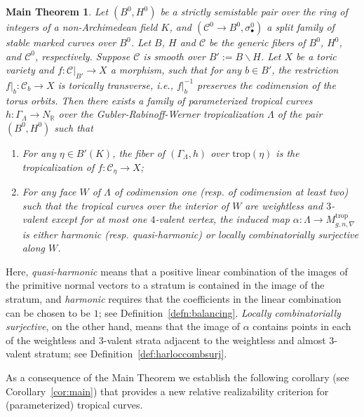 \documentclass[11pt,reqno]{amsart}
\newcommand{\com}[1]{{\color{brown}$\textsuperscript{+}$\marginnote{\small #1}}}
\numberwithin{equation}{section}
\newtheorem*{Thm}{Main Theorem}
\theoremstyle{definition}
\newcommand{\trop}{\mathrm{trop}}
\newcommand{\RR}{{\mathbb R}}
\def\:{\colon}
\newcommand{\cC}{{\mathcal{C}}}
\theoremstyle{remark}
\begin{document}
\begin{Thm}
    Let $(B^0,H^0)$ be a strictly semistable pair over the ring of integers of a non-Archi\-medean field $K$, and $(\cC^0\rightarrow B^0,\sigma^0_\bullet)$ a split family of stable marked curves over $B^0$. Let $B$, $H$ and $\cC$ be the generic fibers of $B^0$, $H^0$, and $\cC^0$, respectively. Suppose $\cC$ is smooth over $B':=B\backslash H$. Let $X$ be a toric variety and $f \colon \cC|_{B'} \rightarrow X$ a morphism, such that for any $b\in B'$, the restriction $f|_b\:\cC_b\to X$ is torically transverse, i.e.,  $f|_b^{-1}$ preserves the codimension of the torus orbits. Then there exists a family of parameterized tropical curves $h\: \Gamma_\Lambda\to N_\RR$ over the Gubler-Rabinoff-Werner tropicalization $\Lambda$ of the pair $(B^0,H^0)$ such that 
    \begin{enumerate}
        \item For any $\eta \in B'(K)$, the fiber of $(\Gamma_\Lambda, h)$ over $\trop(\eta)$ is the tropicalization of $f\:\cC_\eta\to X$;%
        \item For any face $W$ of $\Lambda$ of codimension one (resp. of codimension at least two) such that the tropical curves over the interior of $W$ are weightless and $3$-valent except for at most one $4$-valent vertex, the induced map $\alpha\:\Lambda\to M^{\trop}_{g,n,\nabla}$ is either harmonic (resp. quasi-harmonic) or locally combinatorially surjective along $W$.
    \end{enumerate}
\end{Thm}

Here, {\em quasi-harmonic} means that a positive linear combination of the images of the primitive normal vectors to a stratum is contained in the image of the stratum, and {\em harmonic} requires that the coefficients in the linear combination can be chosen to be $1$; see Definition~\ref{defn:balancing}. {\em Locally combinatorially surjective}, on the other hand, means that the image of $\alpha$ contains points in each of the weightless and $3$-valent strata adjacent to the weightless and almost $3$-valent stratum; see Definition~\ref{def:harloccombsurj}. 

As a consequence of the Main Theorem we establish the following corollary (see Corollary~\ref{cor:main}) that provides a new relative realizability criterion for (parameterized) tropical curves.
\end{document}
